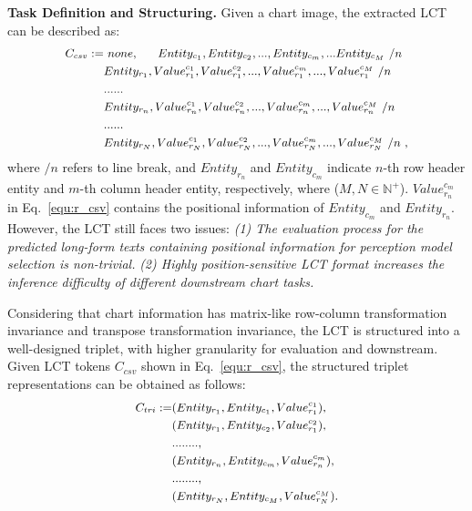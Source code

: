 \documentclass{article} \usepackage{iclr2024_conference,times}
\begin{document}
\noindent\textbf{Task Definition and Structuring.} 
Given a chart image, the extracted LCT can be described as:
\begin{equation}
\small
\begin{aligned}
C_{csv} := & \ none, \ \ \ \ \ Entity_{c_1},Entity_{c_2},...,Entity_{c_m},...Entity_{c_M} \ /n\\
&Entity_{r_1},Value_{r_1}^{c_1},Value_{r_1}^{c_2},...,Value_{r_1}^{c_m},...,Value_{r_1}^{c_M} \ /n\\
&......\\
&Entity_{r_n},Value_{r_n}^{c_1},Value_{r_n}^{c_2},...,Value_{r_n}^{c_m},...,Value_{r_n}^{c_M} \ /n\\
&......\\
&Entity_{r_N},Value_{r_N}^{c_1},Value_{r_N}^{c_2},...,Value_{r_N}^{c_m},...,Value_{r_N}^{c_M} \ /n \ ,
\end{aligned}
\label{equ:r_csv}
\end{equation}
where {\small $/n$} refers to line break, and {\small $Entity_{r_n}$} and {\small $Entity_{c_m}$} indicate {\small $n$-th} row header entity and {\small $m$-th} column header entity, respectively, where {\small ($M,N\in \mathbb{{N}^+}$)}. {\small $Value_{r_n}^{c_m}$} in Eq.~\ref{equ:r_csv} contains the  positional information of {\small $Entity_{c_m}$} and {\small $Entity_{r_n}$}. However, the LCT still faces two issues: \textit{(1) The evaluation process for the predicted long-form texts containing positional information for perception model selection is non-trivial.} \textit{(2) Highly position-sensitive LCT format increases the inference difficulty of different downstream chart tasks.}



Considering that chart information has matrix-like row-column transformation invariance and transpose transformation invariance, the LCT is structured into a well-designed triplet, with higher granularity for evaluation and downstream. Given LCT tokens {\small $C_{csv}$} shown in Eq.~\ref{equ:r_csv}, the structured triplet representations can be obtained as follows:
\begin{equation}
\small
\begin{aligned}
C_{tri} := &(Entity_{r_1}, Entity_{c_1},Value_{r_1}^{c_1}), \\
&(Entity_{r_1}, Entity_{c_2},Value_{r_1}^{c_2}), \\
&........, \\
&(Entity_{r_n}, Entity_{c_m},Value_{r_n}^{c_m}),\\
&........, \\
&(Entity_{r_N}, Entity_{c_M},Value_{r_N}^{c_M}). \\
\end{aligned}
\label{equ:r_tri}
\end{equation}
\end{document}
